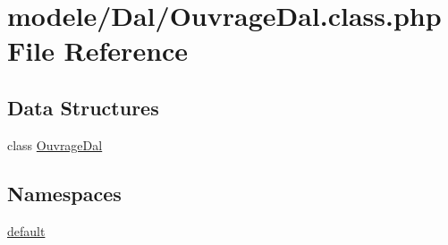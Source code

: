 \hypertarget{_ouvrage_dal_8class_8php}{}\section{modele/\+Dal/\+Ouvrage\+Dal.class.\+php File Reference}
\label{_ouvrage_dal_8class_8php}
\subsection*{Data Structures}
\begin{DoxyCompactItemize}
\item 
class \hyperlink{class_ouvrage_dal}{Ouvrage\+Dal}
\end{DoxyCompactItemize}
\subsection*{Namespaces}
\begin{DoxyCompactItemize}
\item 
 \hyperlink{namespacedefault}{default}
\end{DoxyCompactItemize}
